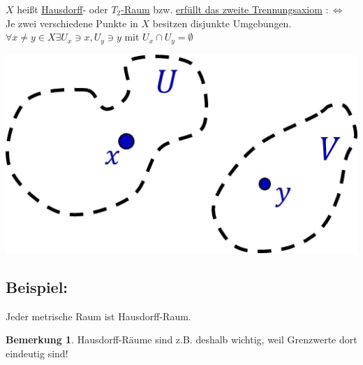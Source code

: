 \documentclass[a4paper,11pt,notitlepage]{report}
\theoremstyle{definition}
\newtheorem{remark}{Bemerkung}[chapter]
\newenvironment{bsp}[1]
{
\setlength{\fboxsep}{10pt}
\subsection*{Beispiel: #1}
\begin{upshape}
}
{
\end{upshape}
}
\newenvironment{definition}[1]{
	\begin{definitions}
	\marginnote{\emph{#1}}
}{\end{definitions}}
\begin{document}
\begin{definition}{$T_2$-Raum}
	$X$ heißt \underline{Hausdorff}- oder \underline{$T_2$-Raum} bzw. \underline{erfüllt das zweite Trennungsaxiom} $:\Leftrightarrow$ Je zwei verschiedene Punkte in $X$ besitzen disjunkte Umgebungen.
	\newline
	$\forall x \neq y \in X \exists U_x \ni x, U_y \ni y$ mit $U_x \cap U_y = \emptyset$
\end{definition}
\begin{center}
\includegraphics[scale=0.4]{images/T2.png}
\end{center}

\begin{bsp}{}
	Jeder metrische Raum ist Hausdorff-Raum.
\end{bsp}

\begin{remark}
Hausdorff-Räume sind z.B. deshalb wichtig, weil Grenzwerte dort eindeutig sind!
\end{remark}
\end{document}
